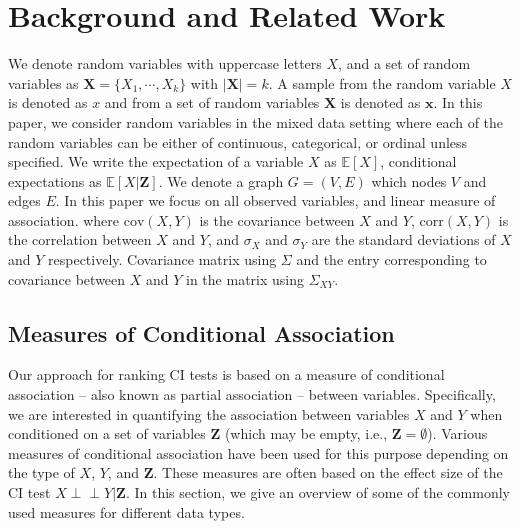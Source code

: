 \documentclass{uai2025} %
\def\ci{\perp\!\!\!\!\!\perp}
\begin{document}

\section{Background and Related Work}
\label{sec:background}
We denote random variables with uppercase letters $ X $, and a set of random
variables as $ \bm{X} = \{X_1, \cdots, X_k\} $ with $ \rvert \bm{X} \rvert = k
$. A sample from the random variable $ X $ is denoted as $ x $ and from a set
of random variables $ \bm{X} $ is denoted as $ \bm{x} $. In this paper, we
consider random variables in the mixed data setting where each of the random
variables can be either of continuous, categorical, or ordinal unless
specified. We write the expectation of a variable $ X $ as $ \mathbb{E}[X] $,
conditional expectations as $ \mathbb{E}[X | \bm{Z}] $. We denote a graph $ G =
(V, E) $ which nodes $ V$ and edges $ E $. In this paper we focus on all
observed variables, and linear measure of association. 
where $ \mathrm{cov}(X, Y) $ is the covariance between $ X $ and $ Y $, $ \mathrm{corr}(X, Y) $ is the correlation between $ X $ and $ Y $, and $
\sigma_X $ and $ \sigma_Y $ are the standard deviations of $ X $ and $ Y $
respectively.  Covariance matrix using $ \Sigma $ and the entry corresponding to
covariance between $ X $ and $ Y $ in the matrix using $ \Sigma_{XY} $.

\subsection{Measures of Conditional Association}
Our approach for ranking CI tests is based on a measure of conditional
association -- also known as partial association -- between variables.
Specifically, we are interested in quantifying the association between
variables $ X $ and $ Y $ when conditioned on a set of variables $ \bm{Z} $
(which may be empty, i.e., $ \bm{Z} = \emptyset $). Various measures of
conditional association have been used for this purpose depending on the type
of $ X $, $ Y $, and $ \bm{Z} $. These measures are often based on the effect
size of the CI test $ X \ci Y \rvert \bm{Z} $. In this section, we give an
overview of some of the commonly used measures for different data types.
\end{document}
